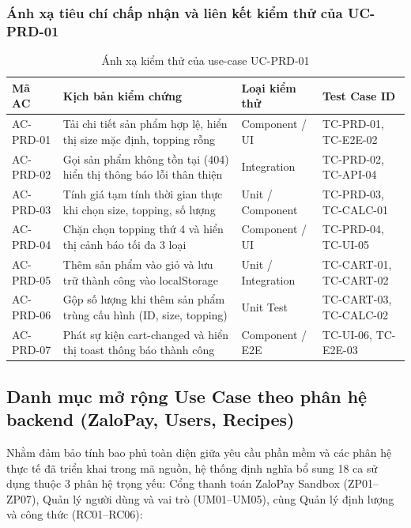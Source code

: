 \subsubsection{Ánh xạ tiêu chí chấp nhận và liên kết kiểm thử của UC-PRD-01}

\begin{table}[H]
\centering\footnotesize
\caption{Ánh xạ kiểm thử của use-case UC-PRD-01}
\label{tab:uc-prd-01-mapping}
\begin{tabularx}{\textwidth}{@{}p{1.7cm} X p{2.2cm} p{2.7cm}@{}}
\toprule
\textbf{Mã AC} & \textbf{Kịch bản kiểm chứng} & \textbf{Loại kiểm thử} & \textbf{Test Case ID} \\
\midrule
AC-PRD-01 & Tải chi tiết sản phẩm hợp lệ, hiển thị size mặc định, topping rỗng & Component / UI & TC-PRD-01, TC-E2E-02 \\
AC-PRD-02 & Gọi sản phẩm không tồn tại (404) hiển thị thông báo lỗi thân thiện & Integration & TC-PRD-02, TC-API-04 \\
AC-PRD-03 & Tính giá tạm tính thời gian thực khi chọn size, topping, số lượng & Unit / Component & TC-PRD-03, TC-CALC-01 \\
AC-PRD-04 & Chặn chọn topping thứ 4 và hiển thị cảnh báo tối đa 3 loại & Component / UI & TC-PRD-04, TC-UI-05 \\
AC-PRD-05 & Thêm sản phẩm vào giỏ và lưu trữ thành công vào localStorage & Unit / Integration & TC-CART-01, TC-CART-02 \\
AC-PRD-06 & Gộp số lượng khi thêm sản phẩm trùng cấu hình (ID, size, topping) & Unit Test & TC-CART-03, TC-CALC-02 \\
AC-PRD-07 & Phát sự kiện cart-changed và hiển thị toast thông báo thành công & Component / E2E & TC-UI-06, TC-E2E-03 \\
\bottomrule
\end{tabularx}
\end{table}

\subsection{Danh mục mở rộng Use Case theo phân hệ backend (ZaloPay, Users, Recipes)}
\label{sec:uc-extended-modules}

Nhằm đảm bảo tính bao phủ toàn diện giữa yêu cầu phần mềm và các phân hệ thực tế đã triển khai trong mã nguồn, hệ thống định nghĩa bổ sung 18 ca sử dụng thuộc 3 phân hệ trọng yếu: Cổng thanh toán ZaloPay Sandbox (ZP01--ZP07), Quản lý người dùng và vai trò (UM01--UM05), cùng Quản lý định lượng và công thức (RC01--RC06):

